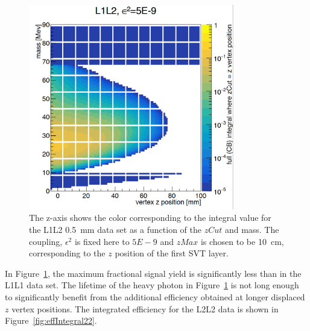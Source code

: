 \begin{figure}[H]
  \centering
      \includegraphics[width=0.8\textwidth]{pics/searching/integralEff12.png}
  \caption[Integral as a function of mass and $zCut$ for L1L2]{The z-axis shows the color corresponding to the integral value for the L1L2 0.5~mm data set as a function of the $zCut$ and mass. The coupling, $\epsilon^2$ is fixed here to $5E-9$ and $zMax$ is chosen to be 10~cm, corresponding to the $z$ position of the first SVT layer. }
  \label{fig:effIntegral12}
\end{figure}

In Figure~\ref{fig:effIntegral12}, the maximum fractional signal yield is significantly less than in the L1L1 data set. The lifetime of the heavy photon in Figure~\ref{fig:effIntegral12} is not long enough to significantly benefit from the additional efficiency obtained at longer displaced $z$ vertex positions. The integrated efficiency for the L2L2 data is shown in Figure~\ref{fig:effIntegral22}.

